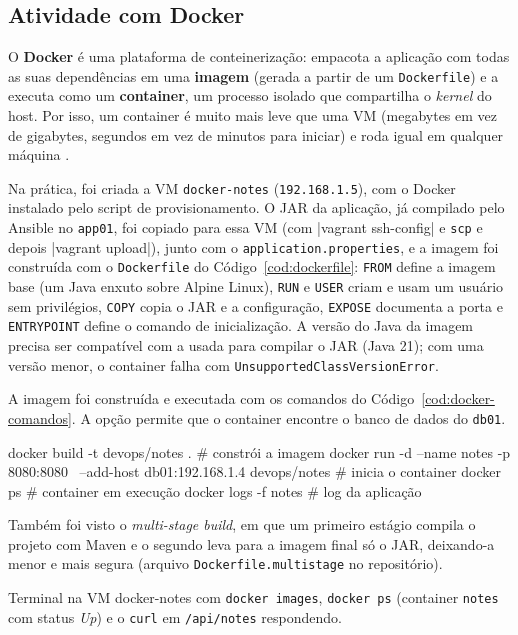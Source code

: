 \subsection{Atividade com Docker}\label{sec:docker}

O \textbf{Docker} é uma plataforma de conteinerização: empacota a aplicação com todas as suas
dependências em uma \textbf{imagem} (gerada a partir de um \texttt{Dockerfile}) e a executa como um
\textbf{container}, um processo isolado que compartilha o \textit{kernel} do host. Por isso, um
container é muito mais leve que uma VM (megabytes em vez de gigabytes, segundos em vez de minutos para
iniciar) e roda igual em qualquer máquina \citep{docker2026,muniz2026}.

Na prática, foi criada a VM \texttt{docker-notes} (\texttt{192.168.1.5}), com o Docker instalado pelo
script de provisionamento. O JAR da aplicação, já compilado pelo Ansible no \texttt{app01}, foi copiado
para essa VM (com \cod|vagrant ssh-config| e \texttt{scp} e depois \cod|vagrant upload|), junto com o
\texttt{application.properties}, e a imagem foi construída com o \texttt{Dockerfile} do
Código~\ref{cod:dockerfile}: \texttt{FROM} define a imagem base (um Java enxuto sobre Alpine Linux),
\texttt{RUN} e \texttt{USER} criam e usam um usuário sem privilégios, \texttt{COPY} copia o JAR e a
configuração, \texttt{EXPOSE} documenta a porta e \texttt{ENTRYPOINT} define o comando de
inicialização. A versão do Java da imagem precisa ser compatível com a usada para compilar o JAR
(Java 21); com uma versão menor, o container falha com \texttt{UnsupportedClassVersionError}.


A imagem foi construída e executada com os comandos do Código~\ref{cod:docker-comandos}. A opção
 permite que o container encontre o banco de dados do \texttt{db01}.

\begin{terminal}[caption={Construção e execução do container},label={cod:docker-comandos}]
docker build -t devops/notes .                             # constrói a imagem
docker run -d --name notes -p 8080:8080 \
  --add-host db01:192.168.1.4 devops/notes                 # inicia o container
docker ps                                                  # container em execução
docker logs -f notes                                       # log da aplicação
\end{terminal}

Também foi visto o
\textit{multi-stage build}, em que um primeiro estágio compila o projeto com Maven e o segundo leva
para a imagem final só o JAR, deixando-a menor e mais segura (arquivo \texttt{Dockerfile.multistage}
no repositório).

%
  {Terminal na VM docker-notes com \texttt{docker images}, \texttt{docker ps} (container
   \texttt{notes} com status \textit{Up}) e o \texttt{curl} em \texttt{/api/notes} respondendo.}
